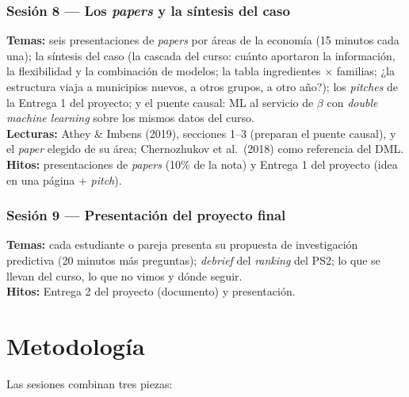 \documentclass[12pt,a4paper]{article}
\begin{document}
\subsubsection{Sesión 8 --- Los \emph{papers} y la síntesis del caso}
\textbf{Temas:} seis presentaciones de \emph{papers} por áreas de la economía (15 minutos cada una); la síntesis del caso (la cascada del curso: cuánto aportaron la información, la flexibilidad y la combinación de modelos; la tabla ingredientes $\times$ familias; ¿la estructura viaja a municipios nuevos, a otros grupos, a otro año?); los \emph{pitches} de la Entrega 1 del proyecto; y el puente causal: ML al servicio de $\beta$ con \emph{double machine learning} sobre los mismos datos del curso. \\
\textbf{Lecturas:} Athey \& Imbens (2019), secciones 1--3 (preparan el puente causal), y el \emph{paper} elegido de su área; Chernozhukov et al.\ (2018) como referencia del DML. \\
\textbf{Hitos:} presentaciones de \emph{papers} (10\% de la nota) y Entrega 1 del proyecto (idea en una página + \emph{pitch}).

\subsubsection{Sesión 9 --- Presentación del proyecto final}
\textbf{Temas:} cada estudiante o pareja presenta su propuesta de investigación predictiva (20 minutos más preguntas); \emph{debrief} del \emph{ranking} del PS2; lo que se llevan del curso, lo que no vimos y dónde seguir. \\
\textbf{Hitos:} Entrega 2 del proyecto (documento) y presentación.

\section{Metodología}

Las sesiones combinan tres piezas:
\end{document}
